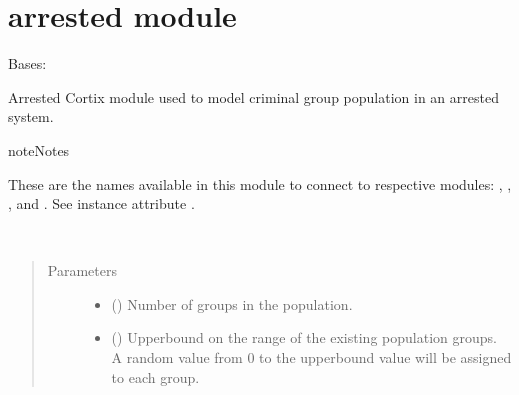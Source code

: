 \documentclass[letterpaper,10pt,openany,oneside,english]{sphinxmanual}
\begin{document}
\section{arrested module}
\label{\detokenize{examples_rst/arrested:module-arrested}}\label{\detokenize{examples_rst/arrested:arrested-module}}\label{\detokenize{examples_rst/arrested::doc}}

\begin{fulllineitems}
\label{\detokenize{examples_rst/arrested:arrested.Arrested}}
Bases: 

Arrested Cortix module used to model criminal group population in an arrested system.

\begin{sphinxadmonition}{note}{Notes}

These are the  names available in this module to connect to respective
modules: , , , and .
See instance attribute .
\end{sphinxadmonition}

\begin{fulllineitems}
\label{\detokenize{examples_rst/arrested:arrested.Arrested.__init__}}~\begin{quote}\begin{description}
\item[{Parameters}] \leavevmode\begin{itemize}
\item {} 
 () \textendash{} Number of groups in the population.

\item {} 
 () \textendash{} Upperbound on the range of the existing population groups. A random value
from 0 to the upperbound value will be assigned to each group.


\end{itemize}
\end{description}
\end{quote}
\end{fulllineitems}
\end{fulllineitems}
\end{document}
